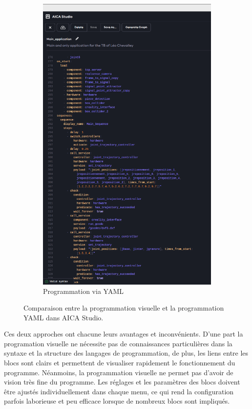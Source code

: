 \begin{figure}[H]
\begin{subfigure}{0.48\textwidth}
        \includegraphics[width=0.95\linewidth]{assets/figures/AICA_Yaml.png}
        \caption{Programmation via YAML}
        \label{fig:prog_yaml}
    \end{subfigure}
    \caption{Comparaison entre la programmation visuelle et la programmation YAML dans AICA Studio.}
    \label{fig:comparaison_yaml_visuel}
\end{figure}

Ces deux approches ont chacune leurs avantages et inconvénients.
D'une part la programation visuelle ne nécessite pas de connaissances particulières dans la syntaxe et la structure des langages de programmation, de plus, les liens entre les blocs sont clairs et permettent de visualiser rapidement le fonctionnement du programme. Néanmoins, la programmation visuelle ne permet pas d'avoir de vision très fine du programme. Les réglages et les paramètres des blocs doivent être ajustés individuellement dans chaque menu, ce qui rend la configuration parfois laborieuse et peu efficace lorsque de nombreux blocs sont impliqués.

